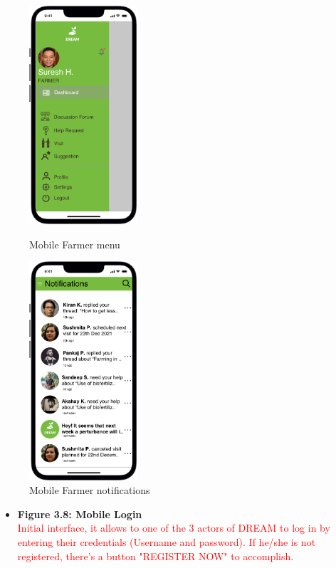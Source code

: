 \begin{figure}[H]
  \centering
   \begin{minipage}{0.4\textwidth}
     \includegraphics[width=40mm,scale=0.9]{./Images//Mocks/Mobile/Farmer_menu.png}
     \caption{Mobile Farmer menu}
   \end{minipage}
    \hfill
   \begin{minipage}{0.4\textwidth}
     \includegraphics[width=40mm,scale=0.9]{./Images//Mocks/Mobile/Farmer_notif.png}
     \caption{Mobile Farmer notifications}
   \end{minipage}
\end{figure}
\newpage
\begin{itemize}
    \item \textbf{Figure 3.8: Mobile Login}\\ 
    \textcolor{red}{Initial interface, it allows to one of the 3 actors of DREAM to log in by entering their credentials (Username and password). If he/she is not registered, there's a button "REGISTER NOW" to accomplish.
    }
\end{itemize}
